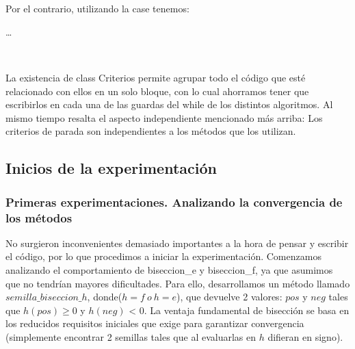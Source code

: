 ~


~

Por el contrario, utilizando la case tenemos:

\begin{algorithmic}
	\While{$!criterios.parar(parameters)$}
		\State \ldots
	\EndWhile
\end{algorithmic}

~

La existencia de class Criterios permite agrupar todo el código que esté relacionado con ellos en un solo bloque, con lo cual ahorramos tener que escribirlos
en cada una de las guardas del while de los distintos algoritmos. Al mismo tiempo resalta el aspecto independiente mencionado más arriba: Los criterios de parada son 
independientes a los métodos que los utilizan.


\subsection{Inicios de la experimentación}

\subsubsection{Primeras experimentaciones. Analizando la convergencia de los métodos}

No surgieron inconvenientes demasiado importantes a la hora de pensar y escribir el código, por lo que procedimos a iniciar la experimentación.
Comenzamos analizando el comportamiento de biseccion\_e y biseccion\_f, ya que asumimos que no tendrían mayores dificultades. Para ello, desarrollamos un método llamado
$semilla\_biseccion\_h$, donde($h = f \ o \ h=e$), que devuelve 2 valores: $pos$ y $neg$ tales que $h(pos)$ y $h(neg)$ < 0. La ventaja fundamental de bisección
se basa en los reducidos requisitos iniciales que exige para garantizar convergencia (simplemente encontrar 2 semillas tales que al evaluarlas en $h$ difieran en signo).

